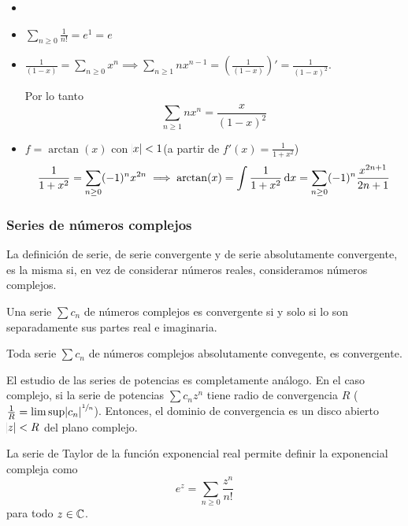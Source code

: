 \begin{example*}
	\begin{itemize}
		\item[]
		\item $\displaystyle \sum_{n \geq 0} \frac{1}{n!} = e^1 = e$
		\item $\displaystyle \frac{1}{(1-x)} = \sum_{n \geq 0} x^n \implies
			\sum_{n \geq 1} n x^{n-1} = \left( \frac{1}{(1-x)} \right)' =
			\frac{1}{(1-x)^2}$.

			Por lo tanto
			\[
				\sum_{n \geq 1} nx^n = \frac{x}{(1-x)^2}
			\]
		\item $f = \arctan(x)$ con $\abs{x} < 1$(a partir de $f'(x) = \frac{1}{1+x^2}$)
			\[
				\frac{1}{1+x^2} = \sum_{n \geq 0} (-1)^n x^{2n} \implies
				\arctan(x) = \int \frac{1}{1+x^2} \dif x = \sum_{n \geq 0} (-1)^n
				\frac{x^{2n+1}}{2n+1}
			\]
	\end{itemize}
\end{example*}

\subsubsection{Series de números complejos}

\begin{defi*}
	La definición de serie, de serie convergente y de serie absolutamente convergente,
	es la misma si, en vez de considerar números reales, consideramos números
	complejos.
\end{defi*}

\begin{prop*}
	Una serie $\sum c_n$ de números complejos es convergente si y solo si lo son
	separadamente sus partes real e imaginaria.
\end{prop*}

\begin{prop*}
	Toda serie $\sum c_n$ de números complejos absolutamente convegente, es
	convergente.
\end{prop*}

\begin{obs*}
	El estudio de las series de potencias es completamente análogo. En el caso
	complejo, si la serie de potencias $\sum c_n z^n$ tiene radio de convergencia
	$R$ ($\frac{1}{R} = \limsup \abs{c_n}^{\sfrac{1}{n}}$). Entonces, el dominio de
	convergencia es un disco abierto $\abs{z} < R$ del plano complejo.
\end{obs*}

\begin{obs*}
	La serie de Taylor de la función exponencial real permite definir la exponencial
	compleja como
	\[
		e^z = \sum_{n \geq 0} \frac{z^n}{n!}
	\]
	para todo $z \in \mathbb{C}$.
\end{obs*}

